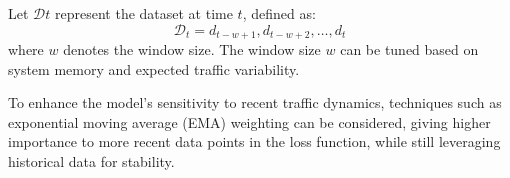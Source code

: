 Let $\mathcal{D}t$ represent the dataset at time $t$, defined as:
\begin{equation}
\mathcal{D}_t = {d_{t - w + 1}, d_{t - w + 2}, \ldots, d_t}
\end{equation}
where $w$ denotes the window size. The window size $w$ can be tuned based on system memory and expected traffic variability.

To enhance the model’s sensitivity to recent traffic dynamics, techniques such as exponential moving average (EMA) weighting can be considered, giving higher importance to more recent data points in the loss function, while still leveraging historical data for stability.